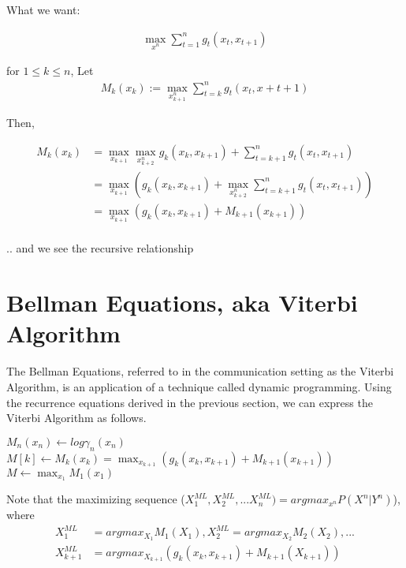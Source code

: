 \documentclass{article}
\begin{document}
What we want:

\begin{align*}
\max_{x^n} \sum_{t=1}^{n} g_t (x_t , x_{t+1})
\end{align*}

\begin{definition}
	for $1 \leq k \leq n$, Let
	\begin{align*}
	M_k (x_k) := \max_{x_{k+1}^{n}} \sum_{t=k}^{n} g_t (x_t, x+{t+1})
	\end{align*}
\end{definition}

Then,

\begin{align*}
M_k (x_k) &= \max_{x_{k+1}} \max_{x_{k+2}^n} g_k (x_k, x_{k+1}) + \sum_{t=k+1}^{n} g_t (x_t, x_{t+1})\\
&=  \max_{x_{k+1}}  (g_k (x_k, x_{k+1}) + \max_{x_{k+2}^{n}}  \sum_{t=k+1}^{n} g_t (x_t, x_{t+1})  ) \\
&=  \max_{x_{k+1}}  (g_k (x_k, x_{k+1}) + M_{k+1}(x_{k+1}  ))\\ 
\end{align*}

.. and we see the recursive relationship

\section{Bellman Equations, aka Viterbi Algorithm}

The Bellman Equations, referred to in the communication setting as the Viterbi Algorithm, is an application of a technique called dynamic programming. Using the recurrence equations derived in the previous section, we can express the Viterbi Algorithm as follows.

\begin{algorithm}

\begin {algorithmic}[1]

    \State $M_n(x_n) \gets log \gamma_n(x_n)$ 
        \State $M[k] \gets M_k(x_k) = \max_{x_{k+1}}  (g_k (x_k, x_{k+1}) + M_{k+1}(x_{k+1}))$
    \EndFor
    \State $M \gets \max_{x_1} M_1 (x_1)$ 
\EndFunction
\end{algorithmic}
\end{algorithm}

Note that the maximizing sequence ($X_1^{ML}, X_2^{ML}, ... X_n^{ML}) = argmax_{x^n} P(X^n|Y^n)$), where
\begin{align*}
X_1^{ML} &= argmax_{X_1} M_1(X_1), X_2^{ML} = argmax_{X_2} M_2(X_2), ...\\
X_{k+1}^{ML} &= argmax_{X_{k+1}}(g_k(x_k, x_{k+1}) + M_{k+1}(X_{k+1}))
\end{align*}
\end{document}
